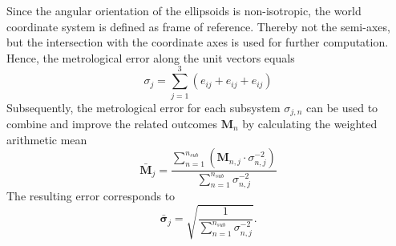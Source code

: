 \documentclass[5p,times,procedia]{elsarticle}
\begin{document}
%
Since the angular orientation of the ellipsoids is non-isotropic, the world coordinate system
is defined as frame of reference. Thereby not the semi-axes, but the intersection with the coordinate
axes is used for further computation. Hence, the metrological error along the unit vectors equals
%
\begin{equation}
	\sigma_j = \sum_{j=1}^{3} \left( e_{ij} + e_{ij} + e_{ij}\right)
\end{equation}
%
Subsequently, the metrological error for each subsystem $\sigma_{j,n}$ can be used to combine and improve the related outcomes $\mathbf{M}_n$ by calculating the weighted arithmetic mean \cite{Price1972}
\begin{equation}
	\mathbf{\bar{M}}_{j} = \frac{\sum_{n=1}^{n_{sub}} \left( \mathbf{M}_{n,j} \cdot \sigma_{n,j}^{-2} \right)}{\sum_{n=1}^{n_{sub}} \sigma_{n,j}^{-2}}
\end{equation}
The resulting error corresponds to
\begin{equation}
	\mathbf{\bar{\sigma}}_{j} = \sqrt{ \frac{1}{\sum_{n=1}^{n_{sub}} \sigma_{n,j}^{-2}} }.
	\label{eqn:sum_noise}
\end{equation}
%
\end{document}
